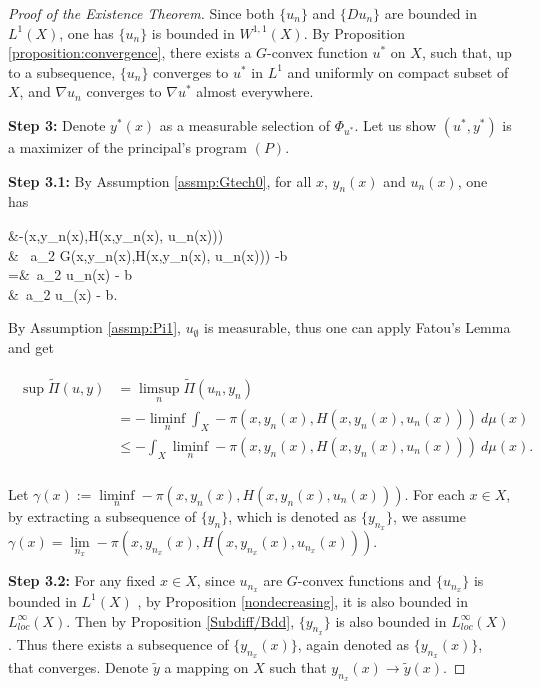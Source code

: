 \documentclass[a4paper, 11pt]{amsart}
\numberwithin{equation}{section}
\theoremstyle{plain}
\theoremstyle{definition}
\theoremstyle{remark}
\newcommand{\N}{\mathbf{N}}
\begin{document}
\begin{proof}[Proof of the Existence Theorem]
	Since both $\{u_n\}$ and $\{Du_n\}$ are bounded in $L^1(X)$, one has $\{u_n\}$ is bounded in $W^{1,1}(X)$. By Proposition \ref{proposition:convergence}, there exists a $G$-convex function $u^*$ on $X$, such that, up to a subsequence, $\{u_n\}$ converges to $u^*$ in $L^1$ and uniformly on compact subset of $X$, and $\nabla u_n$ converges to $\nabla u^*$ almost everywhere.\medskip

{\bf Step 3: } Denote $y^*(x)$ as a measurable selection of $\Phi_{u^*}$. Let us show $(u^*,y^*)$ is a maximizer of the principal's program $(P)$. \medskip

	{\bf Step 3.1: }By Assumption \ref{assmp:Gtech0}, for all $x$, $y_n(x)$ and $u_n(x)$,
	one has
	\begin{flalign*}
	&-\pi(x,y_n(x),H(x,y_n(x), u_n(x)))\\
	\ge & \ a_2 G(x,y_n(x),H(x,y_n(x), u_n(x))) -b \\
	=&\  a_2 u_n(x) - b \\
	\ge&\ a_2 u_{\emptyset}(x) - b.
	\end{flalign*}


By Assumption \ref{assmp:Pi1}, $u_{\emptyset}$ is measurable, thus one can apply Fatou's Lemma and get

	\begin{align}\label{3}
	\begin{split}
	\sup \tilde{\Pi}(u,y) & = \limsup\limits_{n} \tilde{\Pi}(u_n, y_n) \\
	&= -\liminf\limits_{n} \int_{X} - \pi(x, y_n(x), H(x,y_n(x),u_n(x)))  ~d\mu(x)\\
	& \le - \int_{X} \liminf\limits_{n} - \pi(x, y_n(x), H(x,y_n(x),u_n(x)))~ d\mu(x). \\
	\end{split}
	\end{align}
	
Let $\gamma(x):=\liminf\limits_{n} - \pi(x, y_n(x), H(x,y_n(x),u_n(x)))$. 
For each $x\in X$, by extracting a subsequence of $\{y_{n} \}$, which is denoted as $\{y_{n_x}\}$, we assume $\gamma(x) = \lim\limits_{n_x} - \pi(x, y_{n_x}(x), H(x,y_{n_x}(x),u_{n_x}(x)))$. \medskip
	
	{\bf Step 3.2: } 	For any fixed $x \in X$, since $u_{n_x}$ are $G$-convex functions and $\{u_{n_x}\}$ is bounded in $L^1(X)$%
	, by Proposition \ref{nondecreasing}, it is also bounded in $L_{loc}^{\infty}(X)$. 	Then by Proposition \ref{Subdiff/Bdd}, $\{y_{n_x}\}$ is also bounded in $L_{loc}^{\infty}(X)$ . Thus there exists a subsequence of $\{y_{n_x}(x)\}$, again denoted as $\{y_{n_x}(x)\}$, that converges. Denote $\tilde{y}$ a mapping on $X$ such that $y_{n_x}(x) \longrightarrow \tilde{y}(x)$.\medskip
	

\end{proof}
\end{document}
